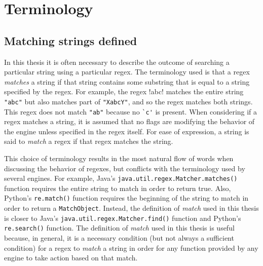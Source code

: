 \section{Terminology}

\subsection{Matching strings defined}
\label{sec:matchingDefined}
In this thesis it is often necessary to describe the outcome of searching a particular string using a particular regex.  The terminology used is that a regex \emph{matches} a string if that string contains some substring that is equal to a string specified by the regex.  For example, the regex \cverb!abc! matches the entire string \verb!"abc"! but also matches part of \verb!"XabcY"!, and so the regex matches both strings.  This regex does not match \verb!"ab"! because no \verb!`c'! is present.  When considering if a regex matches a string, it is assumed that no flags are modifying the behavior of the engine unless specified in the regex itself.  For ease of expression, a string is said to \emph{match} a regex if that regex matches the string.

This choice of terminology results in the most natural flow of words when discussing the behavior of regexes, but conflicts with the terminology used by several engines.  For example, Java's {\tt java.util.regex.Matcher.matches()} function requires the entire string to match in order to return true.  Also, Python's {\tt re.match()} function requires the beginning of the string to match in order to return a {\tt MatchObject}.  Instead, the definition of \emph{match} used in this thesis is closer to Java's {\tt java.util.regex.Matcher.find()} function and Python's {\tt re.search()} function.  The definition of \emph{match} used in this thesis is useful because, in general, it is a necessary condition (but not always a sufficient condition) for a regex to \emph{match} a string in order for any function provided by any engine to take action based on that match.

